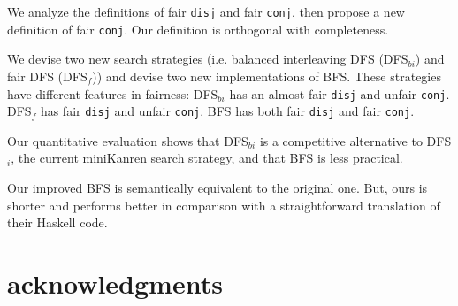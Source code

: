\documentclass[format=acmlarge, review=true, authordraft=true]{acmart}
\newcommand{\conj}{\texttt{conj}}
\newcommand{\disj}{\texttt{disj}}
\newcommand{\DFSi }[0]{DFS$_{i}$}
\newcommand{\DFSf }[0]{DFS$_{f}$}
\newcommand{\DFSbi}[0]{DFS$_{bi}$}
\newcommand{\BFS}[0]{BFS}
\newcommand{\BFSser}[0]{BFS}
\begin{document}
We analyze the definitions of fair \disj{} and fair \conj{}, then propose a 
new definition of fair \conj{}. Our definition is orthogonal with completeness.

We devise two new search strategies (i.e. balanced interleaving DFS 
(\DFSbi{}) and fair DFS (\DFSf{})) and devise two new 
implementations of \BFS. These strategies have different features 
in fairness: \DFSbi{} has an almost-fair \disj{} and unfair \conj{}. 
\DFSf{} has fair \disj{} and unfair \conj{}. \BFS{} has both fair
\disj{} and fair \conj{}.

Our quantitative evaluation shows that \DFSbi{} is a competitive 
alternative to \DFSi{}, the current miniKanren search strategy,
and that \BFS{} is less practical.

Our improved \BFS{} is semantically equivalent to the original 
one. But, ours is shorter and performs better in comparison with a 
straightforward translation of their Haskell code.



\section*{acknowledgments}



\end{document}
